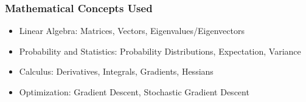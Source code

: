 {\begin{highlight}[\CSPBML]
        \subsubsection*{Mathematical Concepts Used}
        
        \begin{itemize}
            \item Linear Algebra: Matrices, Vectors, Eigenvalues/Eigenvectors
            \item Probability and Statistics: Probability Distributions, Expectation, Variance
            \item Calculus: Derivatives, Integrals, Gradients, Hessians
            \item Optimization: Gradient Descent, Stochastic Gradient Descent
        \end{itemize}    
    \end{highlight}
}